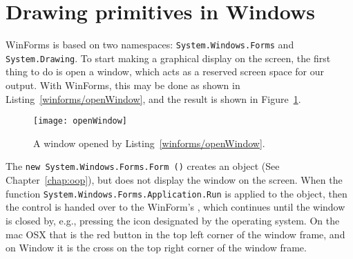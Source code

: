 \section{Drawing primitives in Windows}
WinForms is based on two namespaces: \lstinline!System.Windows.Forms! and \lstinline!System.Drawing!. To start making a graphical display on the screen, the first thing to do is open a window, which acts as a reserved screen space for our output. With WinForms, this may be done as shown in Listing~\ref{winforms/openWindow}, and the result is shown in Figure~\ref{fig:openWindow}.
%
%
\begin{figure}
  \centering
  \texttt{[image: openWindow]}
  \caption{A window opened by Listing~\ref{winforms/openWindow}.}
  \label{fig:openWindow}
\end{figure}
The \lstinline!new System.Windows.Forms.Form ()! creates an object (See Chapter~\ref{chap:oop}), but does not display the window on the screen. When the function \lstinline!System.Windows.Forms.Application.Run! is applied to the object, then the control is handed over to the WinForm's , which continues until the window is closed by, e.g., pressing the icon designated by the operating system. On the mac OSX that is the red button in the top left corner of the window frame, and on Window it is the cross on the top right corner of the window frame.

